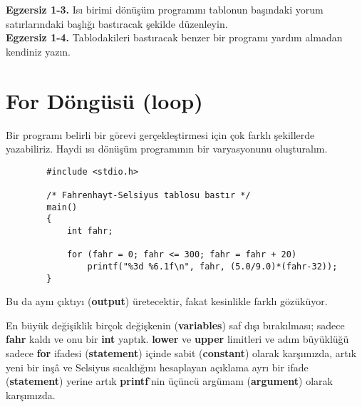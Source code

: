 \documentclass[a4paper,12pt,oneside]{book}
\begin{document}
\noindent \textbf{Egzersiz 1-3.} Isı birimi dönüşüm programını tablonun başındaki yorum satırlarındaki başlığı bastıracak şekilde düzenleyin. \\


\noindent \textbf{Egzersiz 1-4.} Tablodakileri bastıracak benzer bir programı yardım almadan kendiniz yazın.

\section{For Döngüsü (loop)}

\par Bir programı belirli bir görevi gerçekleştirmesi için çok farklı şekillerde yazabiliriz. Haydi ısı dönüşüm programının bir varyasyonunu oluşturalım.

\begin{lstlisting}
		#include <stdio.h>

        /* Fahrenhayt-Selsiyus tablosu bastır */
        main()
        {
            int fahr;

            for (fahr = 0; fahr <= 300; fahr = fahr + 20)
                printf("%3d %6.1f\n", fahr, (5.0/9.0)*(fahr-32));
        }
\end{lstlisting}

Bu da aynı çıktıyı (\textbf{output}) üretecektir, fakat kesinlikle farklı gözüküyor.

\pagebreak En büyük değişiklik birçok değişkenin (\textbf{variables}) saf dışı bırakılması; sadece \textbf{fahr} kaldı ve onu bir \textbf{int} yaptık. \textbf{lower} ve \textbf{upper} limitleri ve adım büyüklüğü sadece \textbf{for} ifadesi (\textbf{statement}) içinde sabit (\textbf{constant}) olarak karşımızda, artık yeni bir inşâ ve Selsiyus sıcaklığını hesaplayan açıklama ayrı bir ifade (\textbf{statement}) yerine artık \textbf{printf}'nin üçüncü argümanı (\textbf{argument}) olarak karşımızda.
\end{document}
